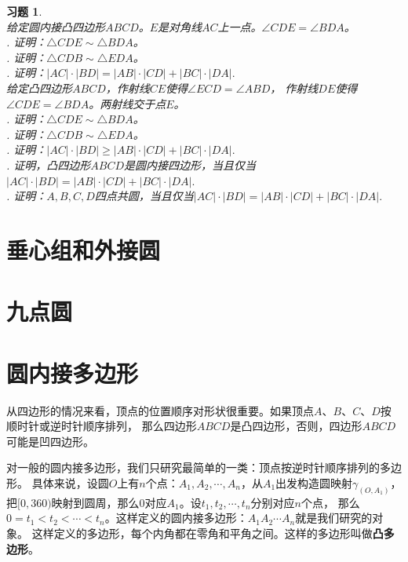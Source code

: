 \documentclass[12pt,UTF8]{ctexbook}
\newtheorem{xt}{习题}[section]
\begin{document}
\begin{xt}
    \mbox{}\\
    给定圆内接凸四边形$ABCD$。$E$是对角线$AC$上一点。$\angle CDE = \angle BDA$。\\
    . 证明：$\triangle CDE \sim \triangle BDA$。\\
    . 证明：$\triangle CDB \sim \triangle EDA$。\\
    . 证明：$|AC| \cdot |BD| = |AB| \cdot |CD| + |BC| \cdot |DA|.$\\
    给定凸四边形$ABCD$，作射线$CE$使得$\angle ECD = \angle ABD$，
    作射线$DE$使得$\angle CDE = \angle BDA$。两射线交于点$E$。\\
    . 证明：$\triangle CDE \sim \triangle BDA$。\\
    . 证明：$\triangle CDB \sim \triangle EDA$。\\
    . 证明：$|AC| \cdot |BD| \geqslant |AB| \cdot |CD| + |BC| \cdot |DA|.$ \\
    . 证明，凸四边形$ABCD$是圆内接四边形，当且仅当$|AC| \cdot |BD| = |AB| \cdot |CD| + |BC| \cdot |DA|.$\\
    . 证明：$A,B,C,D$四点共圆，当且仅当$|AC| \cdot |BD| = |AB| \cdot |CD| + |BC| \cdot |DA|.$

\end{xt}

\section{垂心组和外接圆}
\section{九点圆}

\section{圆内接多边形}
从四边形的情况来看，顶点的位置顺序对形状很重要。如果顶点$A$、$B$、$C$、$D$按顺时针或逆时针顺序排列，
那么四边形$ABCD$是凸四边形，否则，四边形$ABCD$可能是凹四边形。

对一般的圆内接多边形，我们只研究最简单的一类：顶点按逆时针顺序排列的多边形。
具体来说，设圆$O$上有$n$个点：$A_1, A_2, \cdots , A_n$，从$A_1$出发构造圆映射$\gamma_{(O,A_1)}$，
把$[0, 360)$映射到圆周，那么$0$对应$A_1$。设$t_1, t_2, \cdots , t_n$分别对应$n$个点，
那么$0 = t_1 < t_2 < \cdots < t_n$。这样定义的圆内接多边形：$A_1A_2\cdots A_n$就是我们研究的对象。
这样定义的多边形，每个内角都在零角和平角之间。这样的多边形叫做\textbf{凸多边形}。
\end{document}

